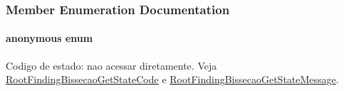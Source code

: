 \subsubsection{Member Enumeration Documentation}
\hypertarget{structRootFindingBissecao_4761213e1c4bcef4e874343a7b8d771a}{
\paragraph["@2]{\setlength{\rightskip}{0pt plus 5cm}anonymous enum}\hfill}
\label{structRootFindingBissecao_4761213e1c4bcef4e874343a7b8d771a}


Codigo de estado: nao acessar diretamente. Veja \hyperlink{group____bissecao_g2ab4fb7daf5901001d011ee85dc4cfe0}{RootFindingBissecaoGetStateCode} e \hyperlink{group____bissecao_gb0455a1f4f30b2e8916d9dff5c237be1}{RootFindingBissecaoGetStateMessage}. 

